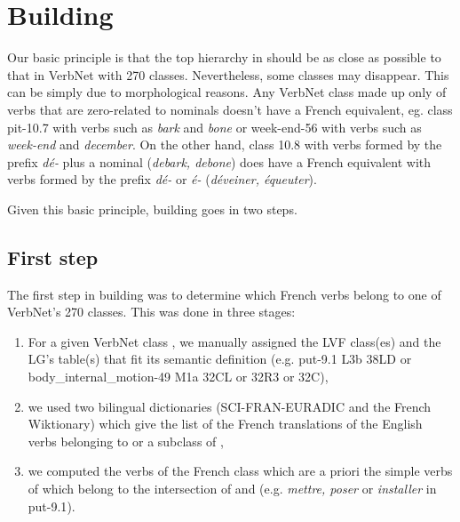 \section{Building \verbenet{}}

Our basic principle is that the top hierarchy in \verbenet{} should be as close
as possible to that in VerbNet with 270 classes. Nevertheless, some classes may
disappear. This can be simply due to morphological reasons. Any VerbNet class
made up only of verbs that are zero-related to nominals doesn't have a French
equivalent, eg. class pit-10.7 with verbs such as \emph{bark} and \emph{bone}
or week-end-56 with verbs such as \emph{week-end} and \emph{december}. On the
other hand, class 10.8 with verbs formed by the prefix \emph{dé-} plus a
nominal (\emph{debark, debone}) does have a French equivalent with verbs formed
by the prefix \emph{dé-} or \emph{é-} (\emph{déveiner, équeuter}).

Given this basic principle, building \verbenet{} goes in two steps.

\subsection{First step}\label{first}

The first step in building \verbenet{} was to determine which French verbs
belong to one of  VerbNet's 270 classes. This was done in three stages:

\begin{enumerate}

    \item For a given VerbNet class \Ce{}, we  manually assigned the LVF class(es)
    \Clvf{} and the LG's table(s) \Clg{} that fit its semantic definition (e.g.
    {\color{blue}put-9.1} {\color{red}L3b} {\color{green}38LD} or
    {\color{blue}body\_internal\_motion-49} {\color{red}M1a} {\color{green}32CL or
    32R3 or 32C}),

    \item we used two bilingual dictionaries (SCI-FRAN-EURADIC and the French
    Wiktionary) which give the list \Ltrad{} of the French translations of the
    English verbs belonging to \Ce{} or a subclass of \Ce{},

    \item we computed the verbs of the French class \Cf{} which are a priori the
    simple verbs of \Ltrad{} which belong to the intersection of \Clvf{} and \Clg{}
    (e.g. \emph{mettre, poser} or \emph{installer} in {\color{blue}put-9.1}).

\end{enumerate}

